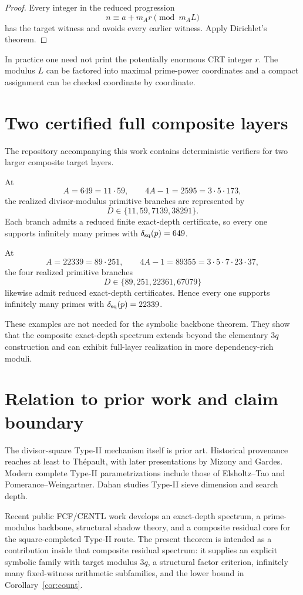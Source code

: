 \documentclass[11pt]{article}
\theoremstyle{definition}
\begin{document}
\begin{proof}
Every integer in the reduced progression
\[
n\equiv a+m_Ar\pmod{m_AL}
\]
has the target witness and avoids every earlier witness.  Apply Dirichlet's theorem.
\end{proof}

In practice one need not print the potentially enormous CRT integer $r$.  The modulus $L$ can be factored into maximal prime-power coordinates and a compact assignment can be checked coordinate by coordinate.

\section{Two certified full composite layers}
The repository accompanying this work contains deterministic verifiers for two larger composite target layers.

At
\[
A=649=11\cdot59,
\qquad
4A-1=2595=3\cdot5\cdot173,
\]
the realized divisor-modulus primitive branches are represented by
\[
D\in\{11,59,7139,38291\}.
\]
Each branch admits a reduced finite exact-depth certificate, so every one supports infinitely many primes with $\delta_{\rm sq}(p)=649$.

At
\[
A=22339=89\cdot251,
\qquad
4A-1=89355=3\cdot5\cdot7\cdot23\cdot37,
\]
the four realized primitive branches
\[
D\in\{89,251,22361,67079\}
\]
likewise admit reduced exact-depth certificates.  Hence every one supports infinitely many primes with $\delta_{\rm sq}(p)=22339$.

These examples are not needed for the symbolic backbone theorem.  They show that the composite exact-depth spectrum extends beyond the elementary $3q$ construction and can exhibit full-layer realization in more dependency-rich moduli.

\section{Relation to prior work and claim boundary}
The divisor-square Type-II mechanism itself is prior art.  Historical provenance reaches at least to Th\'epault, with later presentations by Mizony and Gardes.  Modern complete Type-II parametrizations include those of Elsholtz--Tao and Pomerance--Weingartner.  Dahan studies Type-II sieve dimension and search depth.

Recent public FCF/CENTL work develops an exact-depth spectrum, a prime-modulus backbone, structural shadow theory, and a composite residual core for the square-completed Type-II route.  The present theorem is intended as a contribution inside that composite residual spectrum: it supplies an explicit symbolic family with target modulus $3q$, a structural factor criterion, infinitely many fixed-witness arithmetic subfamilies, and the lower bound in Corollary~\ref{cor:count}.
\end{document}
